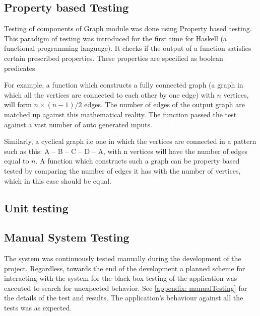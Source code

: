 \subsection{Property based Testing}
Testing of components of Graph module was done using Property based testing.
This paradigm of testing was introduced for the first time for Haskell (a
functional programming language). It checks if the output of a function
satisfies certain prescribed properties. These properties are specified as
boolean predicates.

For example, a function which constructs a fully connected graph (a graph in
which all the vertices are connected to each other by one edge) with $n$
vertices, will form $n \times (n - 1) / 2$ edges. The number of edges of the output
graph are matched up against this mathematical reality. The function passed
the test against a vast number of auto generated inputs.

Similarly, a cyclical graph i.e one in which the vertices are connected in a
pattern such as this: A -- B -- C -- D -- A, with n vertices will have the
number of edges equal to $n$. A function which constructs such a graph can be
property based tested by comparing the number of edges it has with the number
of vertices, which in this case should be equal.

\subsection{Unit testing}

\subsection{Manual System Testing}
The system was continuously tested manually during the development of the
project. Regardless, towards the end of the development a planned scheme for
interacting with the system for the black box testing of the application was
executed to search for unexpected behavior. See \autoref{appendix:
manualTesting} for the details of the test and results. The application's
behaviour against all the tests was as expected.
